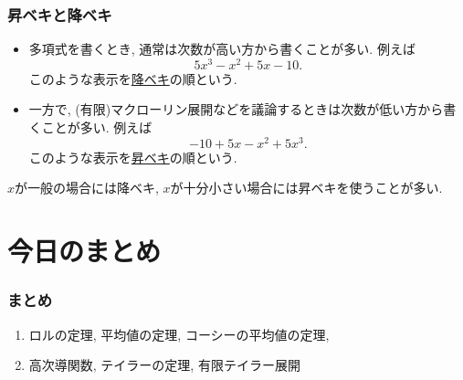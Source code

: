 \documentclass[dvipdfmx,cjk,10.2pt]{beamer}
\theoremstyle{definition}
\begin{document}


\begin{frame}
\frametitle{昇ベキと降ベキ}

\begin{itemize}
\item 多項式を書くとき, 通常は次数が高い方から書くことが多い. 例えば
$$
5x^3-x^2+5x-10. 
$$
このような表示を\underline{降ベキ}の順という. 
\item 一方で, (有限)マクローリン展開などを議論するときは次数が低い方から書くことが多い. 例えば
$$
-10+5x-x^2+5x^3. 
$$
このような表示を\underline{昇ベキ}の順という. 
\end{itemize}

$x$が一般の場合には降ベキ, $x$が十分小さい場合には昇ベキを使うことが多い. 

\end{frame}













\section{今日のまとめ}
\begin{frame}
\frametitle{まとめ}   


\begin{enumerate}
\item ロルの定理, 平均値の定理, コーシーの平均値の定理, 
\item 高次導関数, テイラーの定理, 有限テイラー展開
\end{enumerate} 

\end{frame}
\end{document}
